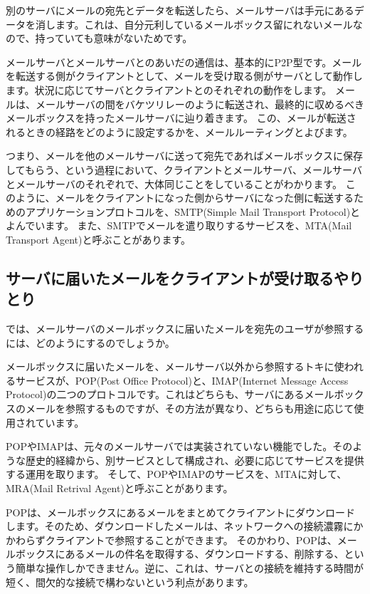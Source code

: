 別のサーバにメールの宛先とデータを転送したら、メールサーバは手元にあるデータを消します。これは、自分元利しているメールボックス留にれないメールなので、持っていても意味がないためです。

メールサーバとメールサーバとのあいだの通信は、基本的にP2P型です。メールを転送する側がクライアントとして、メールを受け取る側がサーバとして動作します。状況に応じてサーバとクライアントとのそれぞれの動作をします。
メールは、メールサーバの間をバケツリレーのように転送され、最終的に収めるべきメールボックスを持ったメールサーバに辿り着きます。
この、メールが転送されるときの経路をどのように設定するかを、メールルーティングとよびます。

つまり、メールを他のメールサーバに送って宛先であればメールボックスに保存してもらう、という過程において、クライアントとメールサーバ、メールサーバとメールサーバのそれぞれで、大体同じことをしていることがわかります。
このように、メールをクライアントになった側からサーバになった側に転送するためのアプリケーションプロトコルを、SMTP(Simple Mail Transport Protocol)とよんでいます。
また、SMTPでメールを遣り取りするサービスを、MTA(Mail Transport Agent)と呼ぶことがあります。


\subsection{サーバに届いたメールをクライアントが受け取るやりとり}

では、メールサーバのメールボックスに届いたメールを宛先のユーザが参照するには、どのようにするのでしょうか。

メールボックスに届いたメールを、メールサーバ以外から参照するトキに使われるサービスが、POP(Post Office Protocol)と、IMAP(Internet Message Access Protocol)の二つのプロトコルです。これはどちらも、サーバにあるメールボックスのメールを参照するものですが、その方法が異なり、どちらも用途に応じて使用されています。

POPやIMAPは、元々のメールサーバでは実装されていない機能でした。そのような歴史的経緯から、別サービスとして構成され、必要に応じてサービスを提供する運用を取ります。
そして、POPやIMAPのサービスを、MTAに対して、MRA(Mail Retrival Agent)と呼ぶことがあります。

POPは、メールボックスにあるメールをまとめてクライアントにダウンロードします。そのため、ダウンロードしたメールは、ネットワークへの接続濃霧にかかわらずクライアントで参照することができます。
そのかわり、POPは、メールボックスにあるメールの件名を取得する、ダウンロードする、削除する、という簡単な操作しかできません。逆に、これは、サーバとの接続を維持する時間が短く、間欠的な接続で構わないという利点があります。

